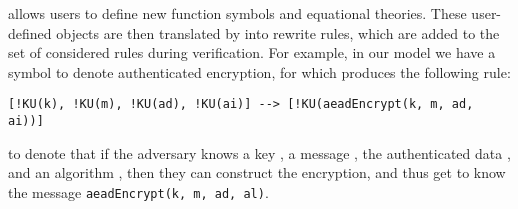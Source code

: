 %


\mTamarin{} allows users to define new function symbols and equational theories.
These user-defined objects are then translated by \mTamarin{} into rewrite
rules, which are added to the set of considered rules during verification.
For example, in our model we have a symbol to denote authenticated encryption,
for which \mTamarin{} produces the following rule:
%
\begin{lstlisting}
[!KU(k), !KU(m), !KU(ad), !KU(ai)] --> [!KU(aeadEncrypt(k, m, ad, ai))]
\end{lstlisting}
%
to denote that if the adversary knows a key , a message , the
authenticated data , and an algorithm , then they can construct
the encryption, and thus get to know the message
\lstinline{aeadEncrypt(k, m, ad, al)}.



